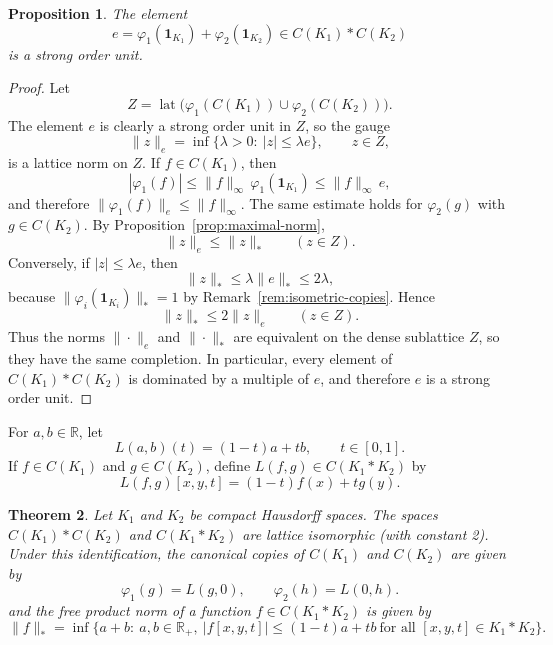 \documentclass[12pt]{amsart}
\DeclareMathOperator{\lat}{lat}
\newcommand{\one}{\mathbf{1}}
\theoremstyle{plain}
\newtheorem{theorem}{Theorem}[section]
\newtheorem{proposition}[theorem]{Proposition}
\theoremstyle{definition}
\begin{document}
\begin{proposition}\label{prop:strong-unit}
The element
\[
e=\varphi_1(\one_{K_1})+\varphi_2(\one_{K_2})\in C(K_1)\ast C(K_2)
\]
is a strong order unit.
\end{proposition}

\begin{proof}
Let
\[
Z=\lat\big(\varphi_1(C(K_1))\cup \varphi_2(C(K_2))\big).
\]
The element $e$ is clearly a strong order unit in $Z$, so the gauge
\[
\|z\|_e=\inf\{\lambda>0:\ |z|\leq \lambda e\},
\qquad z\in Z,
\]
is a lattice norm on $Z$. If $f\in C(K_1)$, then
\[
|\varphi_1(f)|\leq \|f\|_\infty\, \varphi_1(\one_{K_1})\leq \|f\|_\infty\, e,
\]
and therefore $\|\varphi_1(f)\|_e\leq \|f\|_\infty$. The same estimate holds for $\varphi_2(g)$ with $g\in C(K_2)$. By Proposition~\ref{prop:maximal-norm},
\[
\|z\|_e\leq \|z\|_{\ast}
\qquad (z\in Z).
\]
Conversely, if $|z|\leq \lambda e$, then
\[
\|z\|_{\ast}\leq \lambda \|e\|_{\ast}
\leq 2\lambda,
\]
because $\|\varphi_i(\one_{K_i})\|_{\ast}=1$ by Remark~\ref{rem:isometric-copies}. Hence
\[
\|z\|_{\ast}\leq 2\|z\|_e
\qquad (z\in Z).
\]
Thus the norms $\|\cdot\|_e$ and $\|\cdot\|_{\ast}$ are equivalent on the dense sublattice $Z$, so they have the same completion. In particular, every element of $C(K_1)\ast C(K_2)$ is dominated by a multiple of $e$, and therefore $e$ is a strong order unit.
\end{proof}

For $a,b\in \mathbb{R}$, let
\[
L(a,b)(t)=(1-t)a+tb,
\qquad t\in [0,1].
\]
If $f\in C(K_1)$ and $g\in C(K_2)$, define $L(f,g)\in C(K_1\ast K_2)$ by
\[
L(f,g)[x,y,t]=(1-t)f(x)+tg(y).
\]

\begin{theorem}\label{thm:CK-join}
Let $K_1$ and $K_2$ be compact Hausdorff spaces. The spaces $C(K_1)\ast C(K_2)$ and $C(K_1\ast K_2)$ are lattice isomorphic (with constant 2). Under this identification, the canonical copies of $C(K_1)$ and $C(K_2)$ are given by
\[
\varphi_1(g)=L(g,0),
\qquad
\varphi_2(h)=L(0,h).
\]
and the free product norm of a function $f\in C(K_1*K_2)$ is given by
\[
\|f\|_*
=\inf\Big\{a+b:\ a,b\in\mathbb R_+,\ |f[x,y,t]|\leq (1-t)a+tb\ \text{for all } [x,y,t]\in K_1\ast K_2\Big\}.
\]

\end{theorem}
\end{document}
